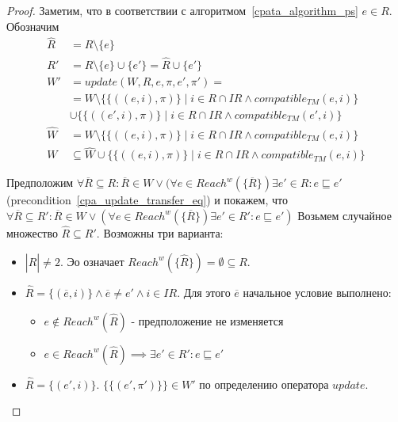 \begin{proof}

Заметим, что в соответствии с алгоритмом~\ref{cpata_algorithm_ps} $e \in R$. Обозначим
\begin{align}
\widehat{R} & = R \setminus \{e\} \nonumber \\
R' & = R \setminus \{e\} \cup \{e'\} = \widehat{R} \cup \{e'\} \nonumber \\
W' & = update(W, R, e, \pi, e', \pi') = \nonumber \\
& = W \setminus \{\{((e, i), \pi)\} \mid i \in R \cap IR \land compatible_{TM}(e, i)\} \nonumber \\
& \cup \{\{((e', i), \pi)\} \mid i \in R \cap IR \land compatible_{TM}(e', i)\}  \nonumber \\
\hat{W} & = W \setminus \{\{((e, i), \pi)\} \mid i \in R \cap IR \land compatible_{TM}(e, i)\} \nonumber \\
W & \subseteq \hat{W} \cup \{\{((e, i), \pi)\} \mid i \in R \cap IR \land compatible_{TM}(e, i)\} \nonumber
\end{align}

Предположим
$\forall \overline{R} \subseteq R: \overline{R} \in W \lor (\forall e \in Reach^w(\{\overline{R}\}) \exists e' \in R: e \sqsubseteq e'$ 
(precondition~\ref{cpa_update_transfer_eq}) и покажем, что
$\forall \overline{R} \subseteq R': \overline{R} \in W \lor (\forall e \in Reach^w(\{\overline{R}\}) \exists e' \in R': e \sqsubseteq e')$
Возьмем случайное множество $\widehat{R} \subseteq R'$. Возможны три варианта:

\begin{itemize}
\item $|\widehat{R}| \neq 2$. Эо означает $Reach^w(\{\widehat{R}\}) = \emptyset \subseteq R$.
\item $\widehat{R} = \{(\overline{e}, i)\} \land \overline{e} \neq e' \land i \in IR$. Для этого $\overline{e}$ начальное условие выполнено:
\begin{itemize}
\item $e \notin Reach^w(\widehat{R})$ - предположение не изменяется
\item $e \in Reach^w(\widehat{R}) \implies \exists e' \in R': e \sqsubseteq e'$ 
\end{itemize}
\item $\widehat{R} = \{(e', i)\}$. $\{\{(e', \pi')\}\} \in W'$ по определению оператора $update$.
\end{itemize}

\end{proof}

